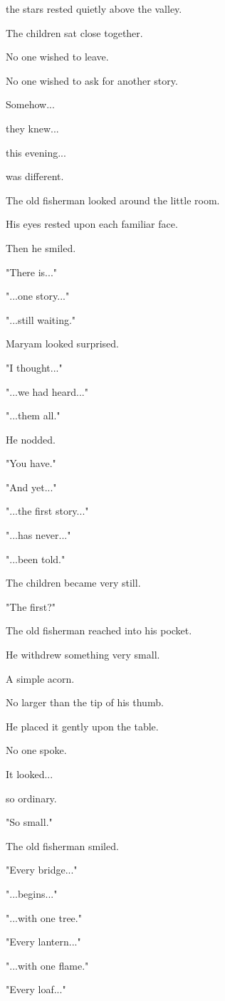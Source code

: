 \documentclass[12pt,openany]{book}
\begin{document}
the stars rested quietly above the valley.

The children sat close together.

No one wished to leave.

No one wished to ask for another story.

Somehow...

they knew...

this evening...

was different.

The old fisherman looked around the little room.

His eyes rested upon each familiar face.

Then he smiled.

"There is..."

"...one story..."

"...still waiting."

Maryam looked surprised.

"I thought..."

"...we had heard..."

"...them all."

He nodded.

"You have."

"And yet..."

"...the first story..."

"...has never..."

"...been told."

The children became very still.

"The first?"

The old fisherman reached into his pocket.

He withdrew something very small.

A simple acorn.

No larger than the tip of his thumb.

He placed it gently upon the table.

No one spoke.

It looked...

so ordinary.

"So small."

The old fisherman smiled.

"Every bridge..."

"...begins..."

"...with one tree."

"Every lantern..."

"...with one flame."

"Every loaf..."
\end{document}

